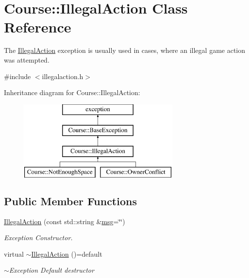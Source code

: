 \hypertarget{classCourse_1_1IllegalAction}{\section{Course\-:\-:Illegal\-Action Class Reference}
\label{classCourse_1_1IllegalAction}
}


The \hyperlink{classCourse_1_1IllegalAction}{Illegal\-Action} exception is usually used in cases, where an illegal game action was attempted.  




{\ttfamily \#include $<$illegalaction.\-h$>$}

Inheritance diagram for Course\-:\-:Illegal\-Action\-:\begin{figure}[H]
\begin{center}
\leavevmode
\includegraphics[height=4.000000cm]{classCourse_1_1IllegalAction}
\end{center}
\end{figure}
\subsection*{Public Member Functions}
\begin{DoxyCompactItemize}
\item 
\hyperlink{classCourse_1_1IllegalAction_aec1eb2ce3f7f9d5c96b70818d88d7514}{Illegal\-Action} (const std\-::string \&\hyperlink{classCourse_1_1BaseException_ac5a744a6af6f2ba9198b58e52bb62f5a}{msg}=\char`\"{}\char`\"{})
\begin{DoxyCompactList}\small\item\em Exception Constructor. \end{DoxyCompactList}\item 
virtual \hyperlink{classCourse_1_1IllegalAction_ae2002931f9099ea01176273cb8d6c9d3}{$\sim$\-Illegal\-Action} ()=default
\begin{DoxyCompactList}\small\item\em $\sim$\-Exception Default destructor \end{DoxyCompactList}\end{DoxyCompactItemize}


